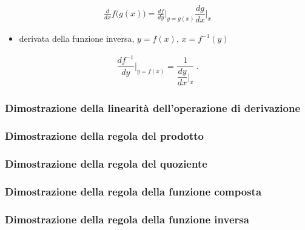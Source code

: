 \documentclass[letterpaper,10pt,italian]{jupyterBook}
\begin{document}
\begin{equation}\label{equation:ch/infinitesimal_calculus/derivatives:infinitesimal-calculus:derivatives:rules:composite}
\begin{split}\frac{d}{dx} f\big( g(x) \big) = \frac{d f}{dy}\Big|_{y=g(x)} \dfrac{d g}{d x}\Big|_{x}\end{split}
\end{equation}\begin{itemize}
\item {} 
\sphinxAtStartPar
derivata della funzione inversa, \(y = f(x)\), \(x = f^{-1}(y)\)

\end{itemize}
\begin{equation}\label{equation:ch/infinitesimal_calculus/derivatives:infinitesimal-calculus:derivatives:rules:inverse}
\begin{split} \dfrac{d f^{-1}}{d y}\bigg|_{y = f(x)} = \dfrac{1}{ \dfrac{d y}{d x}\bigg|_{x}} \ .\end{split}
\end{equation}\subsubsection*{Dimostrazione della linearità dell’operazione di derivazione}

\sphinxAtStartPar
{}
\subsubsection*{Dimostrazione della regola del prodotto}

\sphinxAtStartPar
{}
\subsubsection*{Dimostrazione della regola del quoziente}

\sphinxAtStartPar
{}
\subsubsection*{Dimostrazione della regola della funzione composta}

\sphinxAtStartPar
{}
\subsubsection*{Dimostrazione della regola della funzione inversa}
\end{document}
